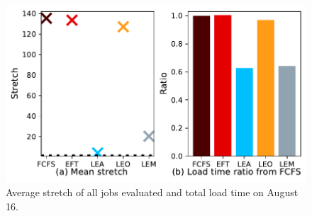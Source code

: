 \documentclass[conference,10pt]{IEEEtran}
\begin{document}
\begin{figure}[t]\centering\includegraphics[width=0.9\linewidth]{../MBSS/plot/Results_FCFS_Score_Backfill_2022-08-16->2022-08-16_V10000_Mean_Stretch_Total_waiting_for_a_load_time_and_transfer_time_450_128_32_256_4_1024.pdf}\caption{Average stretch of all jobs evaluated and total load time on August 16.}\label{stretch.08-16}\end{figure}
\end{document}
